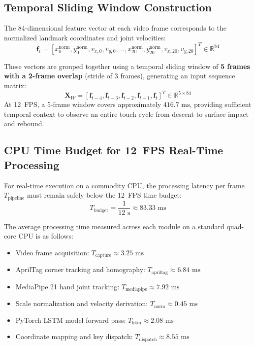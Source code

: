 \subsection{Temporal Sliding Window Construction}
\label{subsec:meth_sliding_window}
The 84-dimensional feature vector at each video frame corresponds to the normalized landmark coordinates and joint velocities:
\begin{equation}
\mathbf{f}_t = \left[ x_0^{\text{norm}}, y_0^{\text{norm}}, v_{x,0}, v_{y,0}, \dots, x_{20}^{\text{norm}}, y_{20}^{\text{norm}}, v_{x,20}, v_{y,20} \right]^T \in \mathbb{R}^{84}
\label{eq:meth_feature_vector}
\end{equation}

These vectors are grouped together using a temporal sliding window of \textbf{5 frames with a 2-frame overlap} (stride of 3 frames), generating an input sequence matrix:
\begin{equation}
\mathbf{X}_W = \left[ \mathbf{f}_{t-4}, \mathbf{f}_{t-3}, \mathbf{f}_{t-2}, \mathbf{f}_{t-1}, \mathbf{f}_t \right]^T \in \mathbb{R}^{5 \times 84}
\label{eq:meth_window_matrix}
\end{equation}
At 12~FPS, a 5-frame window covers approximately $416.7\text{ ms}$, providing sufficient temporal context to observe an entire touch cycle from descent to surface impact and rebound.

\subsection{CPU Time Budget for 12~FPS Real-Time Processing}
\label{subsec:meth_timing_budget}
For real-time execution on a commodity CPU, the processing latency per frame $T_{\text{pipeline}}$ must remain safely below the 12~FPS time budget:
\begin{equation}
T_{\text{budget}} = \frac{1}{12\text{ s}} \approx 83.33\text{ ms}
\label{eq:meth_timing_budget}
\end{equation}

The average processing time measured across each module on a standard quad-core CPU is as follows:
\begin{itemize}
    \item Video frame acquisition: $T_{\text{capture}} \approx 3.25\text{ ms}$
    \item AprilTag corner tracking and homography: $T_{\text{apriltag}} \approx 6.84\text{ ms}$
    \item MediaPipe 21 hand joint tracking: $T_{\text{mediapipe}} \approx 7.92\text{ ms}$
    \item Scale normalization and velocity derivation: $T_{\text{norm}} \approx 0.45\text{ ms}$
    \item PyTorch LSTM model forward pass: $T_{\text{lstm}} \approx 2.08\text{ ms}$
    \item Coordinate mapping and key dispatch: $T_{\text{dispatch}} \approx 8.55\text{ ms}$
\end{itemize}

